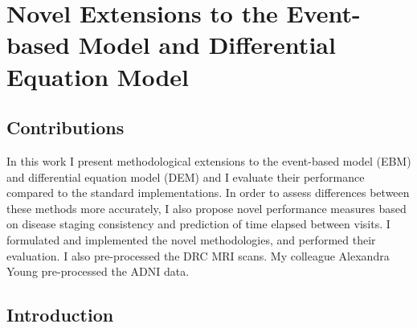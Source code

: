 \chapter[Novel Extensions to the EBM and DEM]{Novel Extensions to the Event-based Model and Differential Equation Model}
\label{chapter:perf}

\section{Contributions}

In this work I present methodological extensions to the event-based model (EBM) and differential equation model (DEM) and I evaluate their performance compared to the standard implementations. In order to assess differences between these methods more accurately, I also propose novel performance measures based on disease staging consistency and prediction of time elapsed between visits. I formulated and implemented the novel methodologies, and performed their evaluation. I also pre-processed the DRC MRI scans. My colleague Alexandra Young pre-processed the ADNI data. 

\section{Introduction}

